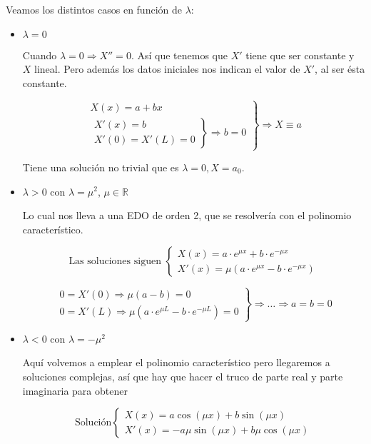 \begin{example}
		Veamos los distintos casos en función de $\lambda$:

		\begin{itemize}
			\item $\lambda = 0$

				Cuando $\lambda = 0 \Rightarrow X'' = 0$. Así que tenemos que $X'$ tiene que ser constante y $X$ lineal. Pero además los datos iniciales nos indican el valor de $X'$, al ser ésta constante.

				\[ \left.
				\begin{array}{l}
					X(x) = a + bx \\
					\left.
					\begin{array}{r}
						X'(x) = b \\
						X'(0) = X'(L) = 0
					\end{array} \right\} \Rightarrow b = 0
				\end{array} \right\} \Rightarrow X \equiv a \]

				Tiene una solución no trivial que es $\lambda = 0, X=a_0$.

			\item $\lambda > 0$ con $\lambda = \mu^2$, $\mu \in \mathbb{R}$

				Lo cual nos lleva a una EDO de orden 2, que se resolvería con el polinomio característico.

				\[ \text{Las soluciones siguen } \left\{
				   \begin{array}{l}
				   	X(x) = a \cdot e^{\mu x} + b \cdot e^{-\mu x} \\
				   	X'(x) = \mu (a\cdot e^{\mu x} - b\cdot e^{-\mu x})
				   \end{array} \right.
				\]

				\[ \left. \begin{array}{l}
					0 = X'(0) \Rightarrow \mu(a - b) = 0 \\
					0 = X'(L) \Rightarrow \mu(a \cdot e^{\mu L} - b \cdot e^{-\mu L}) = 0
				\end{array} \right\}
					\Rightarrow … \Rightarrow a = b = 0
				\]


			\item $\lambda < 0$ con $\lambda = - \mu^2$

				Aquí volvemos a emplear el polinomio característico pero llegaremos a soluciones complejas, así que hay que hacer el truco de parte real y parte imaginaria para obtener

			 	\[ \text{Solución} \left\{
				   \begin{array}{l}
				   	X(x) = a \cos(\mu x ) + b \sin( \mu x) \\
				   	X'(x) = -a \mu \sin(\mu x) + b \mu \cos(\mu x)
				   \end{array} \right.
				\]


\end{itemize}
\end{example}
